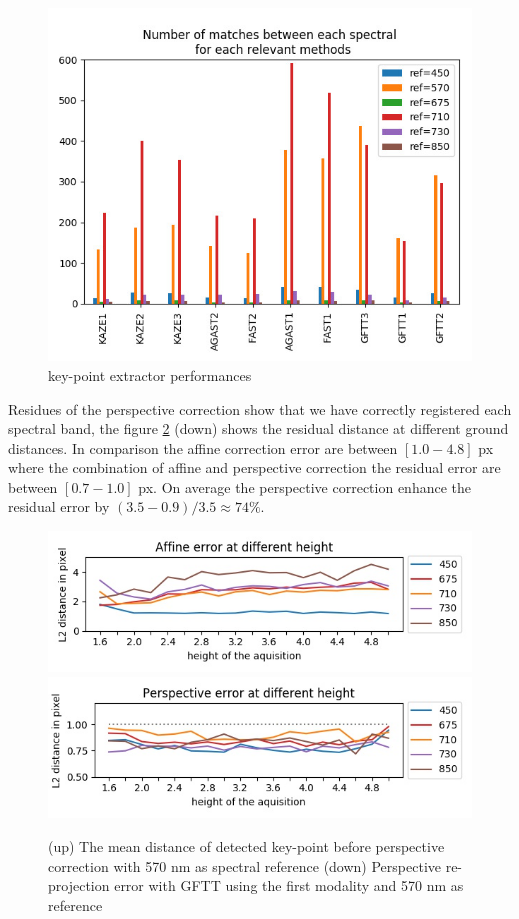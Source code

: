 \documentclass[../thesis.tex]{subfiles}
\begin{document}
	\begin{figure}[H]
		\centering
		\includegraphics[width=0.7\linewidth]{img/registration/comparaison-keypoint-matching-reference-merged}
		\caption{key-point extractor performances}
		\label{fig:features-GFTT-performances}
	\end{figure}
	
	\par Residues of the perspective correction show that we have correctly registered each spectral band,
	the figure \ref{fig:perspective-error} (down) shows the residual distance at different ground distances.
	In comparison the affine correction error are between $[1.0-4.8]$ px where the combination
	of affine and perspective correction the residual error are between $[0.7-1.0]$ px.
	On average the perspective correction enhance the residual error by $(3.5-0.9)/3.5 \approx 74\%$.
	
	\begin{figure}[H]
		\centering
		\includegraphics[width=0.7\linewidth]{img/registration/affine-allignement-rmse.jpg} \\
		\includegraphics[width=0.7\linewidth]{img/registration/prespective-allignement-rmse.jpg}
		\caption{
			(up) The mean distance of detected key-point before perspective correction with 570 nm as spectral reference
			(down) Perspective re-projection error with GFTT using the first modality and 570 nm as reference
		}
		\label{fig:perspective-error}
	\end{figure}
	
\end{document}
